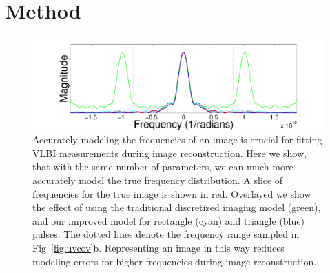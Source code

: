 \section{Method}
\label{section:Method}

\begin{figure}[b]
	\centering
	
	\includegraphics[width=0.95\linewidth]{freqfig_9pulses_wrect_zoom_ex2_2.pdf}
	\caption{\footnotesize{Accurately modeling the frequencies of an image is crucial for fitting VLBI measurements during image reconstruction. Here we show, that with the same number of parameters, we can much more accurately model the true frequency distribution. A slice of frequencies for the true image is shown in red. Overlayed we show the effect of using the traditional discretized imaging model (green), and our improved model for rectangle (cyan) and triangle (blue) pulses. The dotted lines denote the frequency range sampled in Fig~\ref{fig:uvcov}b. Representing an image in this way reduces modeling errors for higher frequencies during image reconstruction.}}
	\label{fig:pulses}
\end{figure}

